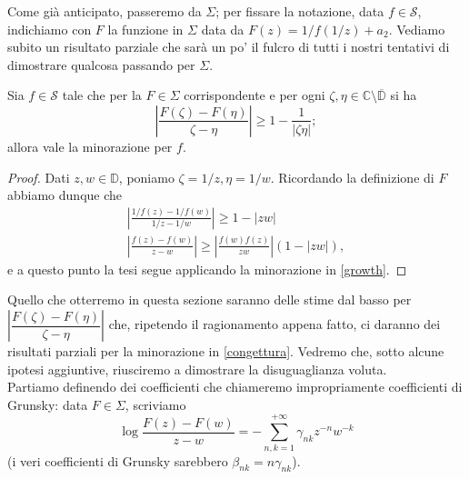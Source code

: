 Come già anticipato, passeremo da $\Sigma$; per fissare la notazione, data $f \in \mathcal{S}$, indichiamo con $F$ la funzione in $\Sigma$ data da $F(z)=1/f(1/z)+a_2$. Vediamo subito un risultato parziale che sarà un po' il fulcro di tutti i nostri tentativi di dimostrare qualcosa passando per $\Sigma$.

\begin{prop} \label{passaggio}
  Sia $f \in \mathcal{S}$ tale che per la $F \in \Sigma$ corrispondente e per ogni $\zeta,\eta \in \mathbb{C}\setminus\overline{\mathbb{D}}$ si ha
  $$\left|\frac{F(\zeta)-F(\eta)}{\zeta-\eta}\right| \ge 1-\frac{1}{|\zeta\eta|};$$
  allora vale la minorazione per $f$.
\end{prop}

\begin{proof}
  Dati $z,w \in \mathbb{D}$, poniamo $\zeta=1/z, \eta=1/w$. Ricordando la definizione di $F$ abbiamo dunque che
  \begin{gather*}
    \left|\frac{1/f(z)-1/f(w)}{1/z-1/w}\right| \ge 1-|zw| \\
    \left|\frac{f(z)-f(w)}{z-w}\right| \ge \left|\frac{f(w)f(z)}{zw}\right| (1-|zw|),
  \end{gather*}
  e a questo punto la tesi segue applicando la minorazione in \eqref{growth}.
\end{proof}

Quello che otterremo in questa sezione saranno delle stime dal basso per $\left|\dfrac{F(\zeta)-F(\eta)}{\zeta-\eta}\right|$ che, ripetendo il ragionamento appena fatto, ci daranno dei risultati parziali per la minorazione in \eqref{congettura}. Vedremo che, sotto alcune ipotesi aggiuntive, riusciremo a dimostrare la disuguaglianza voluta. \\

Partiamo definendo dei coefficienti che chiameremo impropriamente coefficienti di Grunsky: data $F \in \Sigma$, scriviamo
$$\log{\frac{F(z)-F(w)}{z-w}}=-\sum_{n,k=1}^{+\infty} \gamma_{nk}z^{-n}w^{-k}$$
(i veri coefficienti di Grunsky sarebbero $\beta_{nk}=n\gamma_{nk}$).

